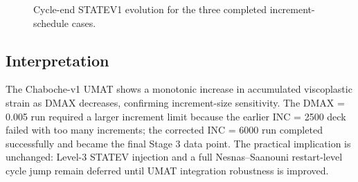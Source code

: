 \begin{figure}[htbp]
    \centering
    \caption{Cycle-end STATEV1 evolution for the three completed increment-schedule cases.}
    \label{fig:stage3_statev1_vs_cycle}
\end{figure}

\subsection{Interpretation}

The Chaboche-v1 UMAT shows a monotonic increase in accumulated viscoplastic strain as DMAX decreases, confirming increment-size sensitivity. The DMAX = 0.005 run required a larger increment limit because the earlier INC = 2500 deck failed with too many increments; the corrected INC = 6000 run completed successfully and became the final Stage 3 data point. The practical implication is unchanged: Level-3 STATEV injection and a full Nesnas--Saanouni restart-level cycle jump remain deferred until UMAT integration robustness is improved.